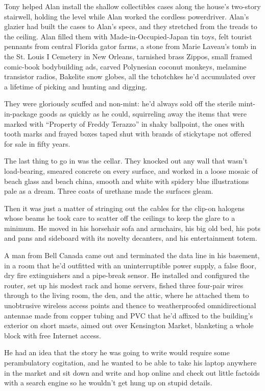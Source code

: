 \documentclass{article}
\begin{document}
Tony helped Alan install the shallow collectibles cases along the
house's two-story stairwell, holding the level while Alan worked the
cordless powerdriver.  Alan's glazier had built the cases to Alan's
specs, and they stretched from the treads to the ceiling.  Alan filled
them with Made-in-Occupied-Japan tin toys, felt tourist pennants from
central Florida gator farms, a stone from Marie Laveau's tomb in the
St.  Louis I Cemetery in New Orleans, tarnished brass Zippos, small
framed comic-book bodybuilding ads, carved Polynesian coconut monkeys,
melamine transistor radios, Bakelite snow globes, all the tchotchkes
he'd accumulated over a lifetime of picking and hunting and digging.

They were gloriously scuffed and non-mint:  he'd always sold off the
sterile mint-in-package goods as quickly as he could, squirreling away
the items that were marked with ``Property of Freddy Terazzo'' in
shaky ballpoint, the ones with tooth marks and frayed boxes taped shut
with brands of stickytape not offered for sale in fifty years.

The last thing to go in was the cellar.  They knocked out any wall
that wasn't load-bearing, smeared concrete on every surface, and
worked in a loose mosaic of beach glass and beach china, smooth and
white with spidery blue illustrations pale as a dream.  Three coats of
urethane made the surfaces gleam.

Then it was just a matter of stringing out the cables for the clip-on
halogens whose beams he took care to scatter off the ceilings to keep
the glare to a minimum.  He moved in his horsehair sofa and armchairs,
his big old bed, his pots and pans and sideboard with its novelty
decanters, and his entertainment totem.

A man from Bell Canada came out and terminated the data line in his
basement, in a room that he'd outfitted with an uninterruptible power
supply, a false floor, dry fire extinguishers and a pipe-break sensor. 
He installed and configured the router, set up his modest rack and
home servers, fished three four-pair wires through to the living room,
the den, and the attic, where he attached them to unobtrusive wireless
access points and thence to weatherproofed omnidirectional antennae
made from copper tubing and PVC that he'd affixed to the building's
exterior on short masts, aimed out over Kensington Market, blanketing
a whole block with free Internet access.

He had an idea that the story he was going to write would require some
perambulatory cogitation, and he wanted to be able to take his laptop
anywhere in the market and sit down and write and hop online and check
out little factoids with a search engine so he wouldn't get hung up on
stupid details.
\end{document}
